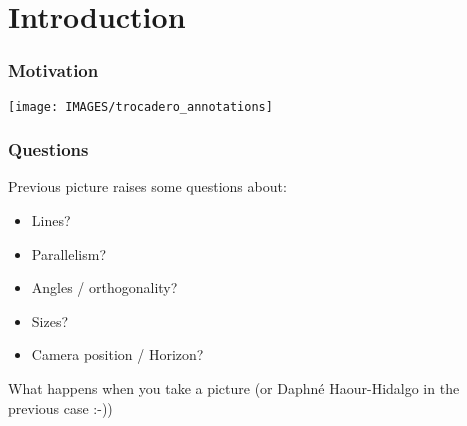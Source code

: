 \documentclass[9pt]{beamer}
\newcommand{\myemph}[1]{{\color{blue}{#1}}}
\begin{document}




\section{Introduction}

\begin{frame}
  \frametitle{Motivation}
  \begin{center}
    \texttt{[image: IMAGES/trocadero\_annotations]}
  \end{center}
\end{frame}


\begin{frame}
  \frametitle{Questions}
  Previous picture raises some questions about:\vfill
  \begin{itemize}
  \item Lines?
  \item Parallelism?
  \item Angles / orthogonality?
  \item Sizes?
  \item Camera position / Horizon?\vfill
  \end{itemize}
  What happens when you take a picture (or Daphn{\'e} Haour-Hidalgo in the previous case :-))
\end{frame}
\end{document}
